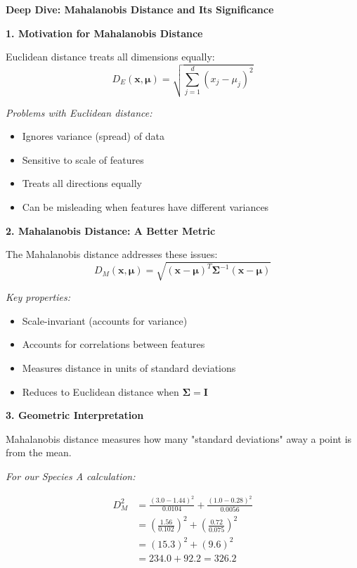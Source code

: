 \documentclass[12pt]{article}
\begin{document}
\begin{explanation}
\textbf{Deep Dive: Mahalanobis Distance and Its Significance}

\textbf{1. Motivation for Mahalanobis Distance}

Euclidean distance treats all dimensions equally:
\[
D_E(\mathbf{x}, \boldsymbol{\mu}) = \sqrt{\sum_{j=1}^{d} (x_j - \mu_j)^2}
\]

\textit{Problems with Euclidean distance:}
\begin{itemize}
    \item Ignores variance (spread) of data
    \item Sensitive to scale of features
    \item Treats all directions equally
    \item Can be misleading when features have different variances
\end{itemize}

\textbf{2. Mahalanobis Distance: A Better Metric}

The Mahalanobis distance addresses these issues:
\[
D_M(\mathbf{x}, \boldsymbol{\mu}) = \sqrt{(\mathbf{x} - \boldsymbol{\mu})^T \boldsymbol{\Sigma}^{-1} (\mathbf{x} - \boldsymbol{\mu})}
\]

\textit{Key properties:}
\begin{itemize}
    \item Scale-invariant (accounts for variance)
    \item Accounts for correlations between features
    \item Measures distance in units of standard deviations
    \item Reduces to Euclidean distance when $\boldsymbol{\Sigma} = \mathbf{I}$
\end{itemize}

\textbf{3. Geometric Interpretation}

Mahalanobis distance measures how many "standard deviations" away a point is from the mean.

\textit{For our Species A calculation:}

\begin{align}
D_M^2 &= \frac{(3.0-1.44)^2}{0.0104} + \frac{(1.0-0.28)^2}{0.0056} \\
&= \left(\frac{1.56}{0.102}\right)^2 + \left(\frac{0.72}{0.075}\right)^2 \\
&= (15.3)^2 + (9.6)^2 \\
&= 234.0 + 92.2 = 326.2
\end{align}


\end{explanation}
\end{document}
